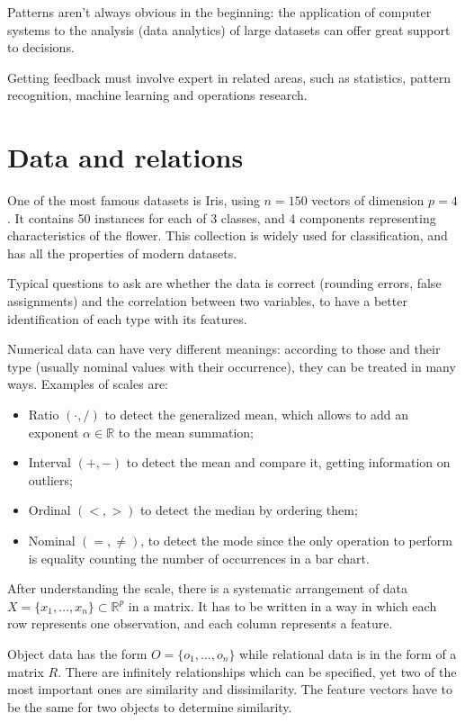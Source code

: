 Patterns aren't always obvious in the beginning: the application of computer systems to the analysis (data analytics) of large datasets can offer great support to decisions.

Getting feedback must involve expert in related areas, such as statistics, pattern recognition, machine learning and operations research.

\section{Data and relations}
One of the most famous datasets is Iris, using $n = 150$ vectors of dimension $p = 4$.
It contains 50 instances for each of 3 classes, and 4 components representing characteristics of the flower. This collection is widely used for classification, and has all the properties of modern datasets. 

Typical questions to ask are whether the data is correct (rounding errors, false assignments) and the correlation between two variables, to have a better identification of each type with its features. 

Numerical data can have very different meanings: according to those and their type (usually nominal values with their occurrence), they can be treated in many ways. Examples of scales are:
\begin{itemize}
	\item Ratio $(\cdot, /)$ to detect the generalized mean, which allows to add an exponent $\alpha \in \mathbb{R}$ to the mean summation;
	\item Interval $(+, -)$ to detect the mean and compare it, getting information on outliers;
	\item Ordinal $(<, >)$ to detect the median by ordering them;
	\item Nominal $(=, \neq)$, to detect the mode since the only operation to perform is equality counting the number of occurrences in a bar chart.
\end{itemize}

After understanding the scale, there is a systematic arrangement of data $X = \{x_1, \dots, x_n\} \subset \mathbb{R}^p$ in a matrix. It has to be written in a way in which each row represents one observation, and each column represents a feature.

Object data has the form $O = \{o_1, \dots, o_n\}$ while relational data is in the form of a matrix $R$. There are infinitely relationships which can be specified, yet two of the most important ones are similarity and dissimilarity. The feature vectors have to be the same for two objects to determine similarity. 

